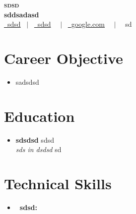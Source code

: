 \documentclass[letterpaper,5pt]{article}
\begin{document}
    
    \begin{center}
      \textbf{\Huge \scshape sdsd} \\ \vspace{5pt}
      \textbf{\large sddsadasd} \\ \vspace{2pt}
      \href{mailto:sdsd}{\raisebox{-0.05\height}\faEnvelope \ sdsd} 
      \ $|$ \ \href{tel:sdsd}{\raisebox{-0.05\height}\faMobile \ sdsd}  \
      \ $|$ \ \href{google.com}{\raisebox{-0.05\height}\faGlobe \ google.com}  \
      \ $|$ \ {\raisebox{-0.05\height}\faMapMarker \ sd} \ \
    \end{center}
    
      \section{Career Objective}
        \begin{itemize}[leftmargin=0.15in, label={}]
          \item{sadsdsd}
        \end{itemize}
    
    \section{Education}
      
      
        \begin{itemize}[leftmargin=0.15in, label={}]
        \item[]
          \textbf{ sdsdsd } \hfill sdsd \\
          \textit{ sds in dsdsd } \hfill sd 
        \end{itemize}
        \vspace{-15pt}
      
      \vspace{10mm}
    
    \vspace*{-10.5mm}  

    
    \section{Technical Skills}
    
        \begin{itemize}[leftmargin=0.15in,label={}]
        \item{
          
            \textbf{\ sdsd: } 
            \newline
            \vspace*{-6mm}  
          
        }

        \end{itemize}
\end{document}
